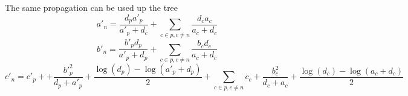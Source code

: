 \documentclass[aps,rmp, onecolumn]{revtex4}
\begin{document}
The same propagation can be used up the tree
\begin{equation}
    a'_n  =  \frac{d_p a'_p}{a'_p+d_c} + \sum_{c\in p, c\neq n} \frac{d_c a_c}{a_c+d_c}
\end{equation}
\begin{equation}
    b'_n = \frac{b'_p d_p}{a'_p + d_p} + \sum_{c\in p, c\neq n}\frac{b_c d_c}{a_c + d_c}
\end{equation}
\begin{equation}
    c'_n = c'_p + + \frac{b'_p^2}{d_p + a'_p} + \frac{\log(d_p) - \log(a'_p+d_p)}{2} +  \sum_{c\in p, c\neq n} c_c  + \frac{b_c^2}{d_c + a_c} + \frac{\log(d_c) - \log(a_c+d_c)}{2}
\end{equation}
\end{document}
